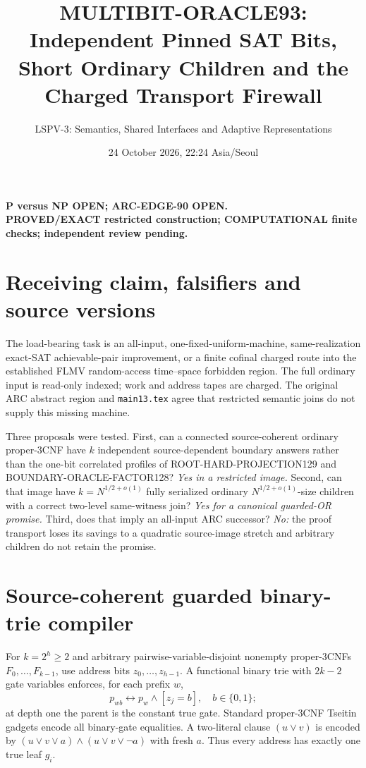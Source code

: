 \documentclass[11pt]{article}
\title{MULTIBIT-ORACLE93: Independent Pinned SAT Bits, Short Ordinary Children and the Charged Transport Firewall}
\author{LSPV-3: Semantics, Shared Interfaces and Adaptive Representations}
\date{24 October 2026, 22:24 Asia/Seoul}
\begin{document}
\maketitle
\begin{center}
\textbf{P versus NP OPEN; ARC-EDGE-90 OPEN.}\\
\textbf{PROVED/EXACT restricted construction; COMPUTATIONAL finite checks; independent review pending.}
\end{center}
\section{Receiving claim, falsifiers and source versions}
The load-bearing task is an all-input, one-fixed-uniform-machine, same-realization exact-SAT achievable-pair improvement, or a finite cofinal charged route into the established FLMV random-access time--space forbidden region. The full ordinary input is read-only indexed; work and address tapes are charged. The original ARC abstract region and \texttt{main13.tex} agree that restricted semantic joins do not supply this missing machine.

Three proposals were tested. First, can a connected source-coherent ordinary proper-3CNF have \(k\) independent source-dependent boundary answers rather than the one-bit correlated profiles of ROOT-HARD-PROJECTION129 and BOUNDARY-ORACLE-FACTOR128? \emph{Yes in a restricted image.} Second, can that image have \(k=N^{1/2+o(1)}\) fully serialized ordinary \(N^{1/2+o(1)}\)-size children with a correct two-level same-witness join? \emph{Yes for a canonical guarded-OR promise.} Third, does that imply an all-input ARC successor? \emph{No:} the proof transport loses its savings to a quadratic source-image stretch and arbitrary children do not retain the promise.

\section{Source-coherent guarded binary-trie compiler}
For \(k=2^h\ge2\) and arbitrary pairwise-variable-disjoint nonempty proper-3CNFs \(F_0,\ldots,F_{k-1}\), use address bits \(z_0,\ldots,z_{h-1}\). A functional binary trie with \(2k-2\) gate variables enforces, for each prefix \(w\),
\[
p_{wb}\longleftrightarrow p_w\wedge[z_j=b],\quad b\in\{0,1\};
\]
at depth one the parent is the constant true gate. Standard proper-3CNF Tseitin gadgets encode all binary-gate equalities. A two-literal clause \((u\vee v)\) is encoded by
\((u\vee v\vee a)\wedge(u\vee v\vee\neg a)\)
with fresh \(a\). Thus every address has exactly one true leaf \(g_i\).
\end{document}
